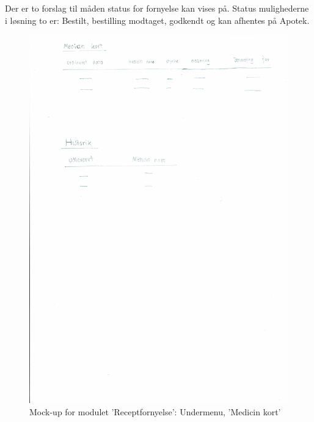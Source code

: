 Der er to forslag til måden status for fornyelse kan vises på. Status mulighederne i løsning to er: Bestilt, bestilling modtaget, godkendt og kan afhentes på Apotek.\\
\begin{figure}[H]
	\centering
	\includegraphics[angle=0, width=\linewidth]{Materials/FornyRecept_Medicinkort.pdf}
	\caption{Mock-up for modulet 'Receptfornyelse': Undermenu, 'Medicin kort'}
	\label{fig:Mock-Up3}
\end{figure}
